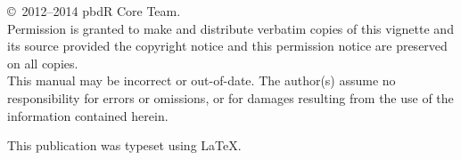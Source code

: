 
\null
\vfill
\copyright\ 2012--2014 pbdR Core Team.\\

Permission is granted to make and distribute verbatim copies of
this vignette and its source provided the copyright notice and
this permission notice are preserved on all copies.\\

This manual may be incorrect or out-of-date.  The author(s) assume
no responsibility for errors or omissions, or for damages resulting
from the use of the information contained herein.

This publication was typeset using \LaTeX.
